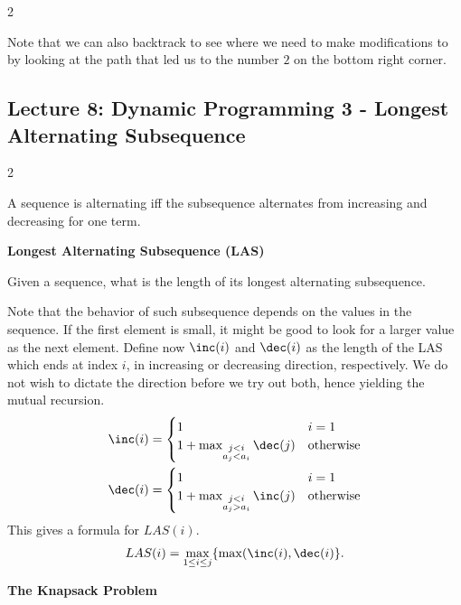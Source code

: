 \begin{multicols}{2}
\begin{example}
    
    Note that we can also backtrack to see where we need to make modifications to  by looking at the path that led us to the number $2$ on the bottom right corner. 
\end{example}
\end{multicols}

\subsection{Lecture 8: Dynamic Programming 3 - Longest Alternating Subsequence}
\begin{multicols}{2}
\begin{definition}
    A sequence is alternating iff the subsequence alternates from increasing and decreasing for one term. 
\end{definition}

\begin{leftbar}
    \textbf{Longest Alternating Subsequence (LAS)} 

    Given a sequence, what is the length of its longest alternating subsequence. 
\end{leftbar}

    Note that the behavior of such subsequence depends on the values in the sequence. If the first element is small, it might be good to look for a larger value as the next element. Define now $\inc(i)$ and $\dec(i)$ as the length of the LAS which ends at index $i$, in increasing or decreasing direction, respectively. We do not wish to dictate the direction before we try out both, hence yielding the mutual recursion.  
    \begin{align*}
    \displaystyle
    \inc(i) &= 
    \begin{cases}
        1 & i = 1 \\
        1 + \max_{\substack{j < i \\ a_j < a_i}}\dec(j) & \textrm{otherwise}
    \end{cases} \\ 
    \dec(i) &= 
    \begin{cases}
        1 & i = 1 \\
        1 + \max_{\substack{j < i \\ a_j > a_i}} \inc(j) & \textrm{otherwise}
    \end{cases}
    \end{align*}
    This gives a formula for $LAS(i)$. 
    $$
    LAS(i) = \max_{1 \leq i \leq j}\{\max(\inc(i), \dec(i)\}.
    $$


\begin{leftbar}
    \textbf{The Knapsack Problem}


\end{leftbar}
\end{multicols}
